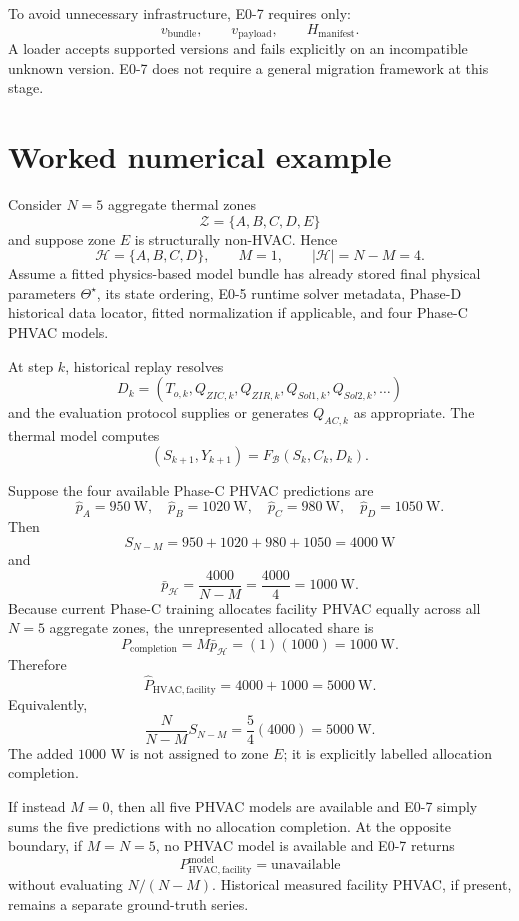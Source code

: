 \documentclass[11pt]{article}
\newcommand{\Bun}{\mathcal{B}}
\begin{document}
To avoid unnecessary infrastructure, E0-7 requires only:
\[
v_{\mathrm{bundle}},
\qquad
v_{\mathrm{payload}},
\qquad
H_{\mathrm{manifest}}.
\]
A loader accepts supported versions and fails explicitly on an incompatible
unknown version. E0-7 does not require a general migration framework at this
stage.

\section{Worked numerical example}

Consider $N=5$ aggregate thermal zones
\[
\mathcal Z=\{A,B,C,D,E\}
\]
and suppose zone $E$ is structurally non-HVAC. Hence
\[
\mathcal H=\{A,B,C,D\},
\qquad M=1,
\qquad |\mathcal H|=N-M=4.
\]
Assume a fitted physics-based model bundle has already stored final physical
parameters $\Theta^\star$, its state ordering, E0-5 runtime solver metadata,
Phase-D historical data locator, fitted normalization if applicable, and four
Phase-C PHVAC models.

At step $k$, historical replay resolves
\[
D_k=(T_{o,k},Q_{ZIC,k},Q_{ZIR,k},Q_{Sol1,k},Q_{Sol2,k},\ldots)
\]
and the evaluation protocol supplies or generates $Q_{AC,k}$ as appropriate.
The thermal model computes
\[
(S_{k+1},Y_{k+1})=F_{\Bun}(S_k,C_k,D_k).
\]

Suppose the four available Phase-C PHVAC predictions are
\[
\hat p_A=950\ \mathrm{W},\quad
\hat p_B=1020\ \mathrm{W},\quad
\hat p_C=980\ \mathrm{W},\quad
\hat p_D=1050\ \mathrm{W}.
\]
Then
\[
S_{N-M}=950+1020+980+1050=4000\ \mathrm{W}
\]
and
\[
\bar p_{\mathcal H}=\frac{4000}{N-M}=\frac{4000}{4}=1000\ \mathrm{W}.
\]
Because current Phase-C training allocates facility PHVAC equally across all
$N=5$ aggregate zones, the unrepresented allocated share is
\[
P_{\mathrm{completion}}
=M\bar p_{\mathcal H}=(1)(1000)=1000\ \mathrm{W}.
\]
Therefore
\[
\boxed{
\hat P_{\mathrm{HVAC,facility}}
=4000+1000
=5000\ \mathrm{W}.
}
\]
Equivalently,
\[
\frac{N}{N-M}S_{N-M}=\frac{5}{4}(4000)=5000\ \mathrm{W}.
\]
The added $1000$ W is not assigned to zone $E$; it is explicitly labelled
allocation completion.

If instead $M=0$, then all five PHVAC models are available and E0-7 simply
sums the five predictions with no allocation completion. At the opposite
boundary, if $M=N=5$, no PHVAC model is available and E0-7 returns
\[
P_{\mathrm{HVAC,facility}}^{\mathrm{model}}=\text{unavailable}
\]
without evaluating $N/(N-M)$. Historical measured facility PHVAC, if present,
remains a separate ground-truth series.
\end{document}

